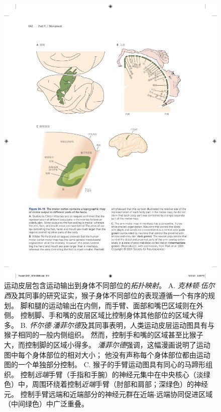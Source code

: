 \begin{figure}[htbp]
	\centering
	\includegraphics[width=1.0\linewidth]{chap34/fig_34_16}
	\caption{运动皮层包含运动输出到身体不同部位的\textit{拓扑映射}。
		A. \textit{克林顿$\cdot$伍尔西}及其同事的研究证实，猴子身体不同部位的表现遵循一个有序的规划。
		脚和腿的运动输出在内侧，而手臂、面部和嘴巴区域则在外侧。
		控制脚、手和嘴的皮层区域比控制身体其他部位的区域大得多。
		B. \textit{怀尔德$\cdot$潘菲尔德}及其同事表明，人类运动皮层运动图具有与猴子相同的一般内侧组织。
		然而，控制手和嘴的区域甚至比猴子大，而控制脚的区域小得多。
		\textit{潘菲尔德}强调，这幅漫画说明了运动图中每个身体部位的相对大小；
		他没有声称每个身体部位都由运动图的一个单独部分控制。
		C. 猴子的手臂运动图具有同心的马蹄形组织。
		控制\textit{远端}手臂（手指和手腕）的神经元集中在中央核心（淡绿色）中，周围环绕着控制\textit{近端}手臂（肘部和肩部；深绿色）的神经元。
		控制手臂远端和近端部分的神经元群在近端-远端协同促进区域（中间绿色）中广泛重叠\cite{park2001consistent}。}
	\label{fig:34_16}
\end{figure}


